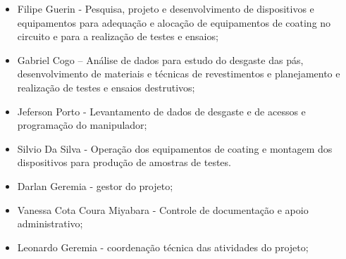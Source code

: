 \begin{itemize}
  \item Filipe Guerin - Pesquisa, projeto e desenvolvimento de dispositivos e
  equipamentos para adequação e alocação de equipamentos de coating no circuito
  e para a realização de testes e ensaios;
  \item Gabriel Cogo – Análise de dados para estudo do desgaste das pás,
  desenvolvimento de materiais e técnicas de revestimentos e planejamento e
  realização de testes e ensaios destrutivos;
  \item Jeferson Porto - Levantamento de dados de desgaste e de acessos e
  programação do manipulador;
  \item Silvio Da Silva - Operação dos equipamentos de coating e montagem dos
  dispositivos para produção de amostras de testes.
  \item Darlan Geremia - gestor do projeto;
  \item Vanessa Cota Coura Miyabara - Controle de documentação e apoio
  administrativo;
  \item Leonardo Geremia - coordenação técnica das atividades do projeto;
\end{itemize}


















    
    
  
